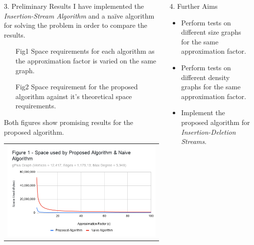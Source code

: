 \documentclass[ %
                    author={Dominic Hutchinson},
                supervisor={Dr. Christian Konrad},
                    degree={MEng Maths  and Computer Science},
                     title={Implementing and Evaluating Space Efficient Algorithms for Detecting Large Neighbourhoods in Graph Streams},
                  subtitle={},
                      type={Research},
                      year={2020} ]{poster}
\begin{document}
\begin{frame}{}
\vfill

\begin{columns}[t]
  \begin{column}{0.422\linewidth}
  \begin{block}{\Large 3. Preliminary Results}
	I have implemented the \textit{Insertion-Stream Algorithm} and a na\"ive algorithm for solving the problem in order to compare the results.
	\begin{itemize}
		\item[Fig1] Space requirements for each algorithm as the approximation factor is varied on the same graph.
		\item[Fig2] Space requirement for the proposed algorithm against it's theoretical space requirements.
\end{itemize}		
Both figures show promising results for the proposed algorithm.
	\begin{center}\begin{tabular}{c}
	\includegraphics[scale=1]{img/Figure1.png}
	\end{tabular}\end{center}	
  \end{block}
  \end{column}
  \begin{column}{0.422\linewidth}
  \begin{block}{\Large 4. Further Aims}
  \begin{itemize}
  \item Perform tests on different size graphs for the same approximation factor.
  \item Perform tests on different density graphs for the same approximation factor.
  \item Implement the proposed algorithm for \textit{Insertion-Deletion Streams}.

\end{itemize}
\end{block}
\end{column}
\end{columns}
\end{frame}
\end{document}
